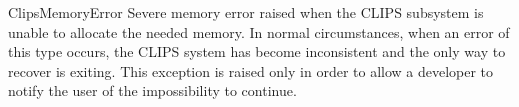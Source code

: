 \begin{excdesc}{ClipsMemoryError}
Severe memory error raised when the CLIPS subsystem is unable to allocate
the needed memory. In normal circumstances, when an error of this type
occurs, the CLIPS system has become inconsistent and the only way to
recover is exiting. This exception is raised only in order to allow a
developer to notify the user of the impossibility to continue.
\end{excdesc}


\begin{seealso}
	\sclipsapg{}

	\item\relax\sclipsbpg{}
\end{seealso}


